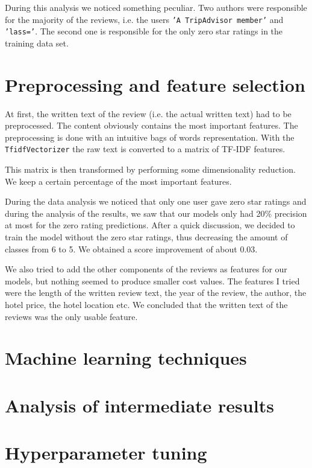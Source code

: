 \documentclass[a4paper,12pt]{article}
\begin{document}
During this analysis we noticed something peculiar. Two authors were responsible for the majority of the reviews, i.e. the users \texttt{'A TripAdvisor member'} and \texttt{'lass='}. The second one is responsible for the only zero star ratings in the training data set.


\section{Preprocessing and feature selection}

At first, the written text of the review (i.e. the actual written text) had to be preprocessed. The content obviously contains the most important features. The preprocessing is done with an intuitive bags of words representation. With the \texttt{TfidfVectorizer} the raw text is converted to a matrix of TF-IDF features.

This matrix is then transformed by performing some dimensionality reduction. We keep a certain percentage of the most important features.

During the data analysis we noticed that only one user gave zero star ratings and during the analysis of the results, we saw that our models only had 20\% precision at most for the zero rating predictions. After a quick discussion, we decided to train the model without the zero star ratings, thus decreasing the amount of classes from 6 to 5. We obtained a score improvement of about $0.03$.

We also tried to add the other components of the reviews as features for our models, but nothing seemed to produce smaller cost values. The features I tried were the length of the written review text, the year of the review, the author, the hotel price, the hotel location etc. We concluded that the written text of the reviews was the only usable feature.


\section{Machine learning techniques}

\section{Analysis of intermediate results}

\section{Hyperparameter tuning}
\end{document}
